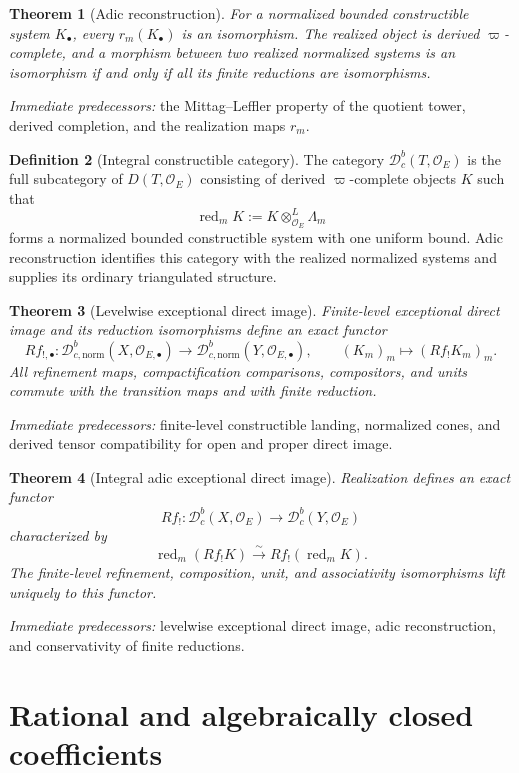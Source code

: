 \documentclass[10pt]{article}
\newtheorem{theorem}{Theorem}[section]
\theoremstyle{definition}
\newtheorem{definition}[theorem]{Definition}
\newcommand{\Dbc}{\mathcal D^b_c}
\newcommand{\Dbcnorm}{\mathcal D^b_{c,\mathrm{norm}}}
\newcommand{\pred}[1]{\par\smallskip\begingroup\footnotesize\raggedright
\emph{Immediate predecessors:} #1.\par\endgroup}
\begin{document}
\begin{theorem}[Adic reconstruction]
For a normalized bounded constructible system \(K_\bullet\), every
\(r_m(K_\bullet)\) is an isomorphism.  The realized object is derived
\(\varpi\)-complete, and a morphism between two realized normalized systems
is an isomorphism if and only if all its finite reductions are
isomorphisms.
\end{theorem}
\pred{the Mittag--Leffler property of the quotient tower, derived completion, and the realization maps \(r_m\)}

\begin{definition}[Integral constructible category]
The category \(\Dbc(T,\mathcal O_E)\) is the full subcategory of
\(D(T,\mathcal O_E)\) consisting of derived \(\varpi\)-complete objects
\(K\) such that
\[
 \operatorname{red}_mK:=
 K\otimes^L_{\mathcal O_E}\Lambda_m
\]
forms a normalized bounded constructible system with one uniform bound.
Adic reconstruction identifies this category with the realized normalized
systems and supplies its ordinary triangulated structure.
\end{definition}

\begin{theorem}[Levelwise exceptional direct image]
Finite-level exceptional direct image and its reduction isomorphisms define
an exact functor
\[
 Rf_{!,\bullet}:
 \Dbcnorm(X,\mathcal O_{E,\bullet})
 \longrightarrow
 \Dbcnorm(Y,\mathcal O_{E,\bullet}),
 \qquad (K_m)_m\longmapsto(Rf_!K_m)_m.
\]
All refinement maps, compactification comparisons, compositors, and units
commute with the transition maps and with finite reduction.
\end{theorem}
\pred{finite-level constructible landing, normalized cones, and derived tensor compatibility for open and proper direct image}

\begin{theorem}[Integral adic exceptional direct image]
Realization defines an exact functor
\[
 Rf_!: \Dbc(X,\mathcal O_E)\longrightarrow\Dbc(Y,\mathcal O_E)
\]
characterized by
\[
 \operatorname{red}_m(Rf_!K)\xrightarrow{\sim}
 Rf_!(\operatorname{red}_mK).
\]
The finite-level refinement, composition, unit, and associativity
isomorphisms lift uniquely to this functor.
\end{theorem}
\pred{levelwise exceptional direct image, adic reconstruction, and conservativity of finite reductions}

\section{Rational and algebraically closed coefficients}
\end{document}
